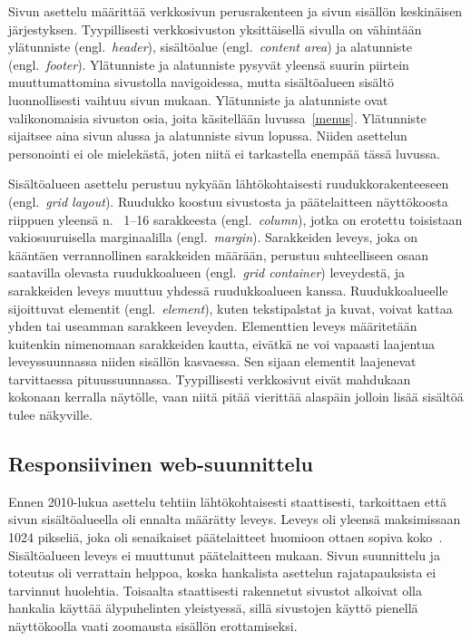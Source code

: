 \documentclass[finnish, 12pt, a4paper, elec, utf8, a-1b, online]{aaltothesis}
\begin{document}
Sivun asettelu määrittää verkkosivun perusrakenteen ja sivun sisällön
keskinäisen järjestyksen. Tyypillisesti verkkosivuston yksittäisellä sivulla on
vähintään ylätunniste (engl.\ \textit{header}), sisältöalue (engl.\
\textit{content area}) ja alatunniste (engl.\ \textit{footer}). Ylätunniste ja
alatunniste pysyvät yleensä suurin piirtein muuttumattomina sivustolla
navigoidessa, mutta sisältöalueen sisältö luonnollisesti vaihtuu sivun mukaan.
Ylätunniste ja alatunniste ovat valikonomaisia sivuston osia, joita käsitellään
luvussa~\ref{menus}. Ylätunniste sijaitsee aina sivun alussa ja alatunniste
sivun lopussa. Niiden asettelun personointi ei ole mielekästä, joten niitä ei
tarkastella enempää tässä luvussa.

Sisältöalueen asettelu perustuu nykyään lähtökohtaisesti ruudukkorakenteeseen
(engl.\ \textit{grid layout}). Ruudukko koostuu sivustosta ja päätelaitteen
näyttökoosta riippuen yleensä n. \ 1--16 sarakkeesta (engl.\ \textit{column}),
jotka on erotettu toisistaan vakiosuuruisella marginaalilla (engl.\
\textit{margin}). Sarakkeiden leveys, joka on kääntäen verrannollinen
sarakkeiden määrään, perustuu suhteelliseen osaan saatavilla olevasta
ruudukkoalueen (engl.\ \textit{grid container}) leveydestä, ja sarakkeiden
leveys muuttuu yhdessä ruudukkoalueen kanssa. Ruudukkoalueelle sijoittuvat
elementit (engl.\ \textit{element}), kuten tekstipalstat ja kuvat, voivat kattaa
yhden tai useamman sarakkeen leveyden. Elementtien leveys määritetään kuitenkin
nimenomaan sarakkeiden kautta, eivätkä ne voi vapaasti laajentua leveyssuunnassa
niiden sisällön kasvaessa. Sen sijaan elementit laajenevat tarvittaessa
pituussuunnassa. Tyypillisesti verkkosivut eivät mahdukaan kokonaan kerralla
näytölle, vaan niitä pitää vierittää alaspäin jolloin lisää sisältöä tulee
näkyville.

\subsection{Responsiivinen web-suunnittelu}\label{responsive-web-design}

Ennen 2010-lukua asettelu tehtiin lähtökohtaisesti staattisesti, tarkoittaen
että sivun sisältöalueella oli ennalta määrätty leveys. Leveys oli yleensä
maksimissaan 1024 pikseliä, joka oli senaikaiset päätelaitteet huomioon ottaen sopiva
koko~\cite{viite?}. Sisältöalueen leveys ei muuttunut päätelaitteen mukaan. Sivun suunnittelu
ja toteutus oli verrattain helppoa, koska hankalista asettelun rajatapauksista
ei tarvinnut huolehtia. Toisaalta staattisesti rakennetut sivustot alkoivat olla
hankalia käyttää älypuhelinten yleistyessä, sillä sivustojen käyttö pienellä
näyttökoolla vaati zoomausta sisällön erottamiseksi.
\end{document}
